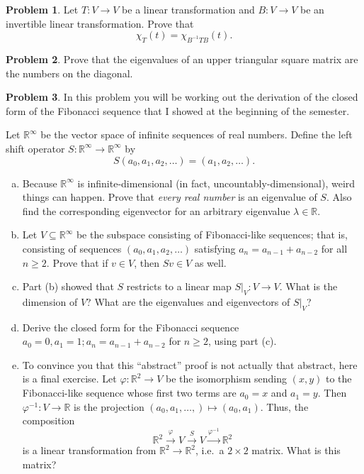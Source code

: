 \documentclass[11pt,oneside]{amsart}
\theoremstyle{definition}
\newtheorem{problem}{Problem}
\newcommand{\bR}{\mathbb{R}}
\begin{document}
    \begin{problem}
        Let $T\colon V\to V$ be a linear transformation and $B\colon V\to V$ be an invertible linear transformation. Prove that
        \[\chi_T(t)=\chi_{B^{-1}TB}(t). \]
    \end{problem}

    \begin{problem}
        Prove that the eigenvalues of an upper triangular square matrix are the numbers on the diagonal.
    \end{problem}

    \begin{problem}
        In this problem you will be working out the derivation of the closed form of the Fibonacci sequence that I showed at the beginning of the semester.
        
        Let $\bR^\infty$ be the vector space of infinite sequences of real numbers. Define the left shift operator $S\colon \bR^\infty\to\bR^\infty$ by
        \[S(a_0,a_1,a_2,\dots)=(a_1,a_2,\dots).\]
        \begin{enumerate}[(a)]
            \item Because $\bR^\infty$ is infinite-dimensional (in fact, uncountably-dimensional), weird things can happen. Prove that \emph{every real number} is an eigenvalue of $S$. Also find the corresponding eigenvector for an arbitrary eigenvalue $\lambda\in\bR$.
            \item Let $V\subseteq\bR^\infty$ be the subspace consisting of Fibonacci-like sequences; that is, consisting of sequences $(a_0,a_1,a_2,\dots)$ satisfying $a_n=a_{n-1}+a_{n-2}$ for all $n\geq 2$. Prove that if $v\in V$, then $Sv\in V$ as well.
            \item Part (b) showed that $S$ restricts to a linear map $S|_V\colon V\to V$. What is the dimension of $V$? What are the eigenvalues and eigenvectors of $S|_V$?
            \item Derive the closed form for the Fibonacci sequence $a_0=0,a_1=1; a_n=a_{n-1}+a_{n-2}$ for $n\geq 2$, using part (c).
            \item To convince you that this ``abstract'' proof is not actually that abstract, here is a final exercise. Let $\varphi\colon\bR^2\to V$ be the isomorphism sending $(x,y)$ to the Fibonacci-like sequence whose first two terms are $a_0=x$ and $a_1=y$. Then $\varphi^{-1}\colon V\to\bR$ is the projection $(a_0,a_1,\dots,)\mapsto (a_0,a_1)$. Thus, the composition
            \[\bR^2\xrightarrow{\varphi}V\xrightarrow S V\xrightarrow{\varphi^{-1}}\bR^2\]
            is a linear transformation from $\bR^2\to\bR^2$, i.e.\ a $2\times 2$ matrix. What is this matrix?
        \end{enumerate}
    \end{problem}
\end{document}
